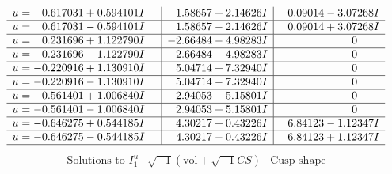\documentclass[1p]{elsarticle_modified}
\theoremstyle{definition}
\newcommand{\I}{\sqrt{-1}}
\begin{document}
$$\begin{array}{c|c|c}
\begin{aligned}
u &= \phantom{-}0.617031 + 0.594101 I\end{aligned}
 & \phantom{-}1.58657 + 2.14626 I & \phantom{-}0.09014 - 3.07268 I \\ \hline\begin{aligned}
u &= \phantom{-}0.617031 - 0.594101 I\end{aligned}
 & \phantom{-}1.58657 - 2.14626 I & \phantom{-}0.09014 + 3.07268 I \\ \hline\begin{aligned}
u &= \phantom{-}0.231696 + 1.122790 I\end{aligned}
 & -2.66484 - 4.98283 I & \phantom{-0.000000 } 0 \\ \hline\begin{aligned}
u &= \phantom{-}0.231696 - 1.122790 I\end{aligned}
 & -2.66484 + 4.98283 I & \phantom{-0.000000 } 0 \\ \hline\begin{aligned}
u &= -0.220916 + 1.130910 I\end{aligned}
 & \phantom{-}5.04714 + 7.32940 I & \phantom{-0.000000 } 0 \\ \hline\begin{aligned}
u &= -0.220916 - 1.130910 I\end{aligned}
 & \phantom{-}5.04714 - 7.32940 I & \phantom{-0.000000 } 0 \\ \hline\begin{aligned}
u &= -0.561401 + 1.006840 I\end{aligned}
 & \phantom{-}2.94053 - 5.15801 I & \phantom{-0.000000 } 0 \\ \hline\begin{aligned}
u &= -0.561401 - 1.006840 I\end{aligned}
 & \phantom{-}2.94053 + 5.15801 I & \phantom{-0.000000 } 0 \\ \hline\begin{aligned}
u &= -0.646275 + 0.544185 I\end{aligned}
 & \phantom{-}4.30217 + 0.43226 I & \phantom{-}6.84123 - 1.12347 I \\ \hline\begin{aligned}
u &= -0.646275 - 0.544185 I\end{aligned}
 & \phantom{-}4.30217 - 0.43226 I & \phantom{-}6.84123 + 1.12347 I\\
 \hline 
 \end{array}$$\newpage$$\begin{array}{c|c|c}  
\text{Solutions to }I^u_{1}& \I (\text{vol} + \sqrt{-1}CS) & \text{Cusp shape}\\

\end{array}$$
\end{document}

